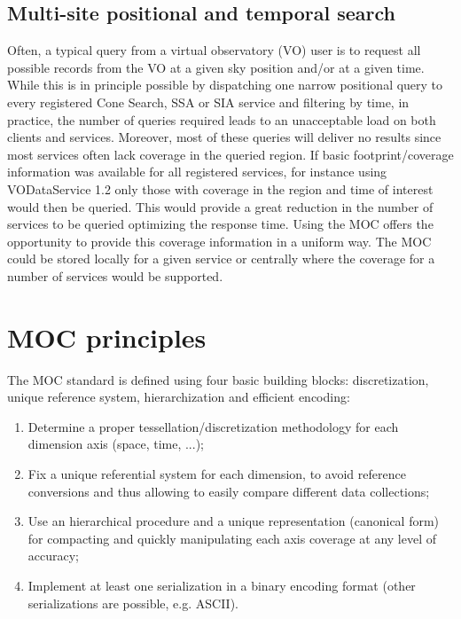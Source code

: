 \documentclass[11pt,a4paper]{ivoa}
\begin{document}
\subsection{Multi-site positional and temporal search}
Often, a typical query from a virtual observatory (VO) user is to
request all possible records from the VO at a given sky position
and/or at a given time. While this is in principle possible by
dispatching one narrow positional query to every registered Cone
Search, SSA or SIA service and filtering by time, in practice, the
number of queries required leads to an unacceptable load on both
clients and services. Moreover, most of these queries will deliver no
results since most services often lack coverage in the queried
region. If basic footprint/coverage information was available for all
registered services, for instance using VODataService 1.2
\citep{2021ivoa.spec.1102D} only those with coverage in the region
and time of interest would then be queried. This would provide a great
reduction in the number of services to be queried optimizing the
response time. Using the MOC offers the opportunity to provide this
coverage information in a uniform way. The MOC could be stored locally
for a given service or centrally where the coverage for a number of
services would be supported.


\section{MOC principles}

The MOC standard is defined using four basic building blocks:
discretization, unique reference system, hierarchization and efficient
encoding: 

\begin{enumerate}
\item Determine a proper tessellation/discretization methodology for
  each dimension axis (space, time, ...);
\item Fix a unique referential system for each dimension, to avoid 
  reference conversions and thus allowing to easily compare different
  data collections; 
\item Use an hierarchical procedure and a unique representation
  (canonical form) for compacting and quickly manipulating each axis
  coverage at any level of accuracy;
\item Implement at least one serialization in a binary encoding format
  (other serializations are possible, e.g. ASCII). 
\end{enumerate} 
\end{document}
